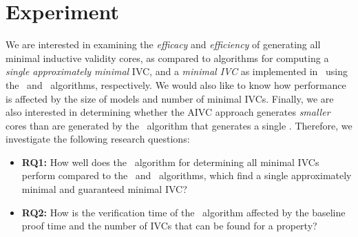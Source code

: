 \section{Experiment}
\label{sec:experiment}

\newcommand{\takeaway}[1]{
\vspace{6pt}
\noindent\fbox{\parbox{\textwidth}{#1}}
\vspace{6pt}
}
We are interested in examining the {\em efficacy} and {\em efficiency} of generating all minimal inductive validity cores, as compared to algorithms for computing a {\em single approximately minimal} IVC, and a {\em minimal IVC} as implemented in~\cite{Ghass16} using the \ucalg\ and \ucbfalg\ algorithms, respectively.  We would also like to know how performance is affected by the size of models and number of minimal IVCs.  Finally, we are also interested in determining whether the AIVC approach generates {\em smaller} cores than are generated by the \ucbfalg\ algorithm that generates a single \mivc.  %
%
%
Therefore, we investigate the following research questions:
\begin{itemize}
  \item \textbf{RQ1:} How well does the \aivcalg ~algorithm for determining all minimal IVCs perform compared to the \ucalg ~and \ucbfalg ~algorithms, which find a single approximately minimal and guaranteed minimal IVC?
  \item \textbf{RQ2:} How is the verification time of the \aivcalg ~algorithm affected by the baseline proof time and the number of IVCs that can be found for a property?
%
\end{itemize}


